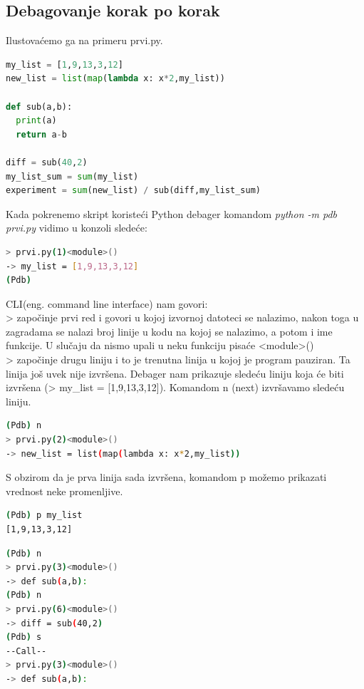 \documentclass[a4paper]{article}
\begin{document}
\subsection{Debagovanje korak po korak}
Ilustovaćemo ga na primeru prvi.py.
\begin{lstlisting}[language = python, caption = {Primer za ilustrovanje narednih komandi (prvi.py)}]
my_list = [1,9,13,3,12]
new_list = list(map(lambda x: x*2,my_list))

def sub(a,b):
  print(a)
  return a-b
  
diff = sub(40,2)
my_list_sum = sum(my_list)
experiment = sum(new_list) / sub(diff,my_list_sum)
\end{lstlisting}
Kada pokrenemo skript koristeći Python debager komandom \emph{python -m pdb prvi.py} vidimo u konzoli sledeće:
\begin{lstlisting}[language = bash, caption={Ulazak u Pdb prompt}]
> prvi.py(1)<module>()
-> my_list = [1,9,13,3,12]
(Pdb)
\end{lstlisting}
CLI(eng. command line interface) nam govori:\\
> započinje prvi red i govori u kojoj izvornoj datoteci se nalazimo, nakon toga u zagradama se nalazi broj linije u kodu na kojoj se nalazimo, a potom i ime funkcije. U slučaju da nismo upali u neku funkciju pisaće <module>()\\
\textendash>  započinje drugu liniju i to je trenutna linija u kojoj je program pauziran. Ta linija još uvek nije izvršena. Debager nam prikazuje sledeću liniju koja će biti izvršena 
(\textendash> my\_list = [1,9,13,3,12]).
Komandom n (next) izvršavamo sledeću liniju.
\begin{lstlisting}[language = bash, caption={Izvršavanje prve linije k\^{o}da}]
(Pdb) n
> prvi.py(2)<module>()
-> new_list = list(map(lambda x: x*2,my_list))
\end{lstlisting}
S obzirom da je prva linija sada izvršena, komandom p možemo prikazati vrednost neke
 promenljive.
\begin{lstlisting}[language = bash, caption={Štampanje promenljive \emph{my\_list}}]
(Pdb) p my_list
[1,9,13,3,12]
\end{lstlisting}
\begin{lstlisting}[language = bash, caption={Izvršavanje naredne dve linije i ulazak u funkciju \emph{sub(40, 2)}}]
(Pdb) n
> prvi.py(3)<module>()
-> def sub(a,b):
(Pdb) n
> prvi.py(6)<module>()
-> diff = sub(40,2)
(Pdb) s
--Call--
> prvi.py(3)<module>()
-> def sub(a,b):
\end{lstlisting}
\end{document}
